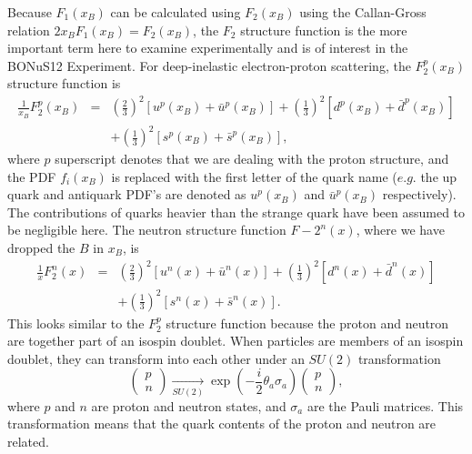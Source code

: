 Because $F_1(x_B)$ can be calculated using $F_2(x_B)$ using the Callan-Gross relation $2x_B F_1(x_B) = F_2(x_B)$, the $F_2$ structure function is the more important term here to examine experimentally and is of interest in the BONuS12 Experiment. For deep-inelastic electron-proton scattering, the $F_2^p(x_B)$ structure function is
\begin{eqnarray}
\label{eqn:F_p}
\frac{1}{x_B} F_2^p(x_B) &=& \left( \frac{2}{3} \right)^2 [u^p(x_B)+\bar{u}^p(x_B)] + \left( \frac{1}{3} \right)^2 [d^p(x_B)+\bar{d}^p(x_B)] \\
&& + \left( \frac{1}{3} \right)^2 [s^p(x_B)+\bar{s}^p(x_B)],
\end{eqnarray}
where $p$ superscript denotes that we are dealing with the proton structure, and the PDF $f_i(x_B)$ is replaced with the first letter of the quark name ($e.g.$ the up quark and antiquark PDF's are denoted as $u^p(x_B)$ and $\bar{u}^p(x_B)$ respectively). The contributions of quarks heavier than the strange quark have been assumed to be negligible here. The neutron structure function $F-2^n(x)$, where we have dropped the $B$ in $x_B$, is
\begin{eqnarray}
\label{eqn:F_n}
\frac{1}{x} F_2^n(x) &=& \left( \frac{2}{3} \right)^2 [u^n(x)+\bar{u}^n(x)] + \left( \frac{1}{3} \right)^2 [d^n(x)+\bar{d}^n(x)] \\
&& + \left( \frac{1}{3} \right)^2 [s^n(x)+\bar{s}^n(x)].
\end{eqnarray}
This looks similar to the $F_2^p$ structure function because the proton and neutron are together part of an isospin doublet. When particles are members of an isospin doublet, they can transform into each other under an $SU(2)$ transformation
\begin{equation*}
\begin{pmatrix}
p \\ n 
\end{pmatrix}
\xrightarrow[\text{$SU(2)$}]{}
\exp \left( -\frac{i}{2}\theta_a \sigma_a \right)
\begin{pmatrix}
p \\ n
\end{pmatrix},
\end{equation*}
where $p$ and $n$ are proton and neutron states, and $\sigma_a$ are the Pauli matrices. This transformation means that the quark contents of the proton and neutron are related.

